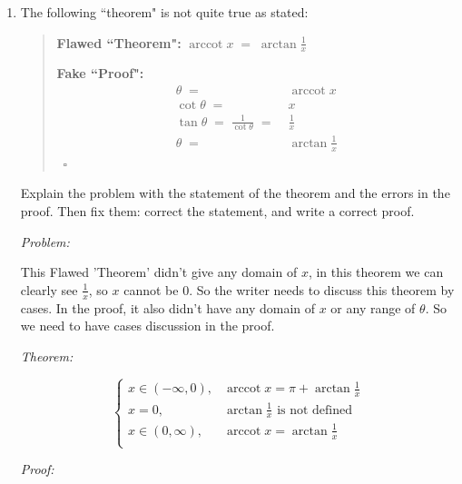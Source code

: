 \documentclass[12pt]{exam}
\newcommand {\DS} [1] {${\displaystyle #1}$}
\newcommand{\vv}{\vspace{.1cm}}
\DeclareMathOperator{\arccot}{arccot}
\begin{document}
\begin{enumerate}
\begin{enumerate}
\newpage

		\item The following ``theorem" is not quite true as stated:
		
			\begin{quotation}
			{\bf Flawed ``Theorem":}   \DS{ \arccot x \; = \; \arctan \frac{1}{x} }
			
			{\bf Fake ``Proof":}   \vspace{-.5cm}
				\begin{align*}
					\theta \; =& \; \arccot x \\
					 \cot \theta \; =& \;  x \\
					 \tan \theta \; = \; \frac{1}{\cot \theta} \; =& \; \frac{1}{x} \\
					 \theta  \; =& \;  \arctan \frac{1}{x}  
				\end{align*}
				\ \hfill $\square$
			\end{quotation}

	Explain the problem with the statement of the theorem and the errors in the proof.  Then fix them: correct the statement, and write a correct proof.
	
	\vv
	
	\emph{Problem:}
	
	\vv
	
	This Flawed 'Theorem' didn't give any domain of $x$, in this theorem we can clearly see $\frac{1}{x}$, so $x$ cannot be 0. So the writer needs to discuss this theorem by cases. In the proof, it also didn't have any domain of $x$ or any range of $\theta.$ So we need to have cases discussion in the proof.
	
	\vv
	
	\emph{Theorem:}
	
	\vv
	$$
	\begin{cases}
	    x\in(-\infty, 0),&\arccot x=\pi+\arctan\frac{1}{x}\\
	    x=0,&\arctan\frac{1}{x} \mbox{ is not defined}\\
	    x\in(0, \infty),&\arccot x=\arctan\frac{1}{x}\\
	\end{cases}
	$$
	\vv
	
	\emph{Proof:}
	
	\vv
	

\end{enumerate}
\end{enumerate}
\end{document}
